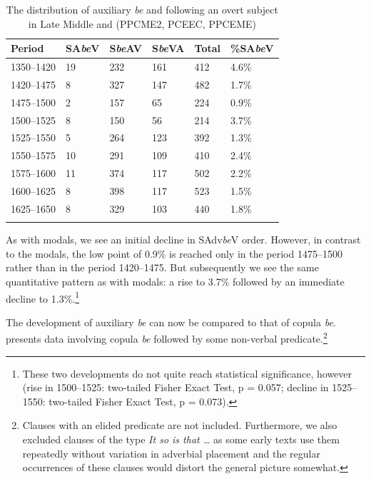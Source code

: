 \documentclass[output=paper]{langsci/langscibook}
\begin{document}
\begin{table}[htbp]
\caption{The distribution of auxiliary \emph{be} and  following an
overt subject in Late Middle and  (PPCME2, PCEEC, PPCEME)}%
\label{tab:key:09.2}
\begin{tabularx}{\textwidth}{lXXXXX}
\lsptoprule
\textbf{Period} & \textbf{SA\emph{be}V} & \textbf{S\emph{be}AV} & \textbf{S\emph{be}VA} & \textbf{Total} & \textbf{\%SA\emph{be}V}\\
\midrule
1350--1420 & 19 & 232 & 161 & 412 & 4.6\%\\
1420--1475 & 8 & 327 & 147 & 482 & 1.7\%\\
1475--1500 & 2 & 157 & 65 & 224 & 0.9\%\\
1500--1525 & 8 & 150 & 56 & 214 & 3.7\%\\
1525--1550 & 5 & 264 & 123 & 392 & 1.3\%\\
1550--1575 & 10 & 291 & 109 & 410 & 2.4\%\\
1575--1600 & 11 & 374 & 117 & 502 & 2.2\%\\
1600--1625 & 8 & 398 & 117 & 523 & 1.5\%\\
1625--1650 & 8 & 329 & 103 & 440 & 1.8\%\\
\lspbottomrule
\end{tabularx}
\end{table}

As with modals, we see an initial decline in SAdv\emph{be}V order. However,
in contrast to the modals, the low point of 0.9\% is reached only in the period
1475--1500 rather than in the period 1420--1475. But subsequently we see the same
quantitative pattern as with modals: a rise to 3.7\% followed by an immediate
decline to 1.3\%.\footnote{These two developments do not quite reach
statistical significance, however (rise in 1500--1525: two-tailed Fisher Exact
Test, p = 0.057; decline in 1525--1550: two-tailed Fisher Exact Test, p =
0.073).}

The development of auxiliary \emph{be} can now be compared to that of copula
\emph{be}.  presents data involving copula \emph{be}
followed by some non-verbal {predicate}.\footnote{Clauses with an elided
    predicate are not included. Furthermore, we also excluded clauses of the
type \emph{It so is that …} as some early texts use them repeatedly without
variation in adverbial placement and the regular occurrences of these clauses
would distort the general picture somewhat.}
\end{document}
